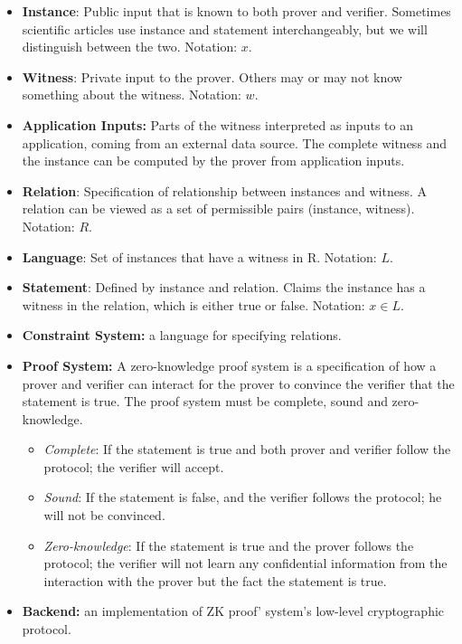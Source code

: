 \begin{itemize}

    \item \textbf{Instance}: Public input that is known to both prover and verifier. Sometimes scientific articles use instance and statement interchangeably, but we will distinguish between the two. Notation: $x$.
    \item \textbf{Witness}: Private input to the prover. Others may or may not know something about the witness. Notation: $w$.
    \item \textbf{Application Inputs:} Parts of the witness interpreted as inputs to an application, coming from an external data source. The complete witness and the instance can be computed by the prover from application inputs.
    \item \textbf{Relation}: Specification of relationship between instances and witness. A relation can be viewed as a set of permissible pairs (instance, witness). Notation: $R$.
    \item \textbf{Language}: Set of instances that have a witness in R. Notation: $L$.
    \item \textbf{Statement}: Defined by instance and relation. Claims the instance has a witness in the relation, which is either true or false. Notation: $x \in L$.
    \item \textbf{Constraint System:} a language for specifying relations.
    \item \textbf{Proof System:} A zero-knowledge proof system is a specification of how a prover and verifier can interact for the prover to convince the verifier that the statement is true. The proof system must be complete, sound and zero-knowledge.
			\begin{itemize}
				\item \emph{Complete}: If the statement is true and both prover and verifier follow the protocol; the verifier will accept.
				\item \emph{Sound}: If the statement is false, and the verifier follows the protocol; he will not be convinced.
				\item \emph{Zero-knowledge}: If the statement is true and the prover follows the protocol; the verifier will not learn any confidential information from the interaction with the prover but the fact the statement is true.
			\end{itemize}
    \item \textbf{Backend:} an implementation of ZK proof’ system’s low-level cryptographic protocol.

\end{itemize}
